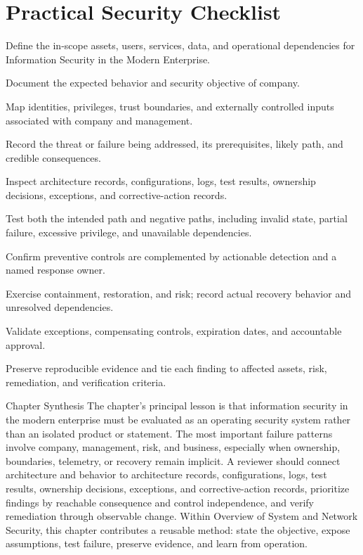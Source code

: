 \documentclass[11pt,letterpaper]{article}
\begin{document}
\section*{Practical Security Checklist}
\begin{CornellChecklist}
\item Define the in-scope assets, users, services, data, and operational dependencies for Information Security in the Modern Enterprise.
\item Document the expected behavior and security objective of company.
\item Map identities, privileges, trust boundaries, and externally controlled inputs associated with company and management.
\item Record the threat or failure being addressed, its prerequisites, likely path, and credible consequences.
\item Inspect architecture records, configurations, logs, test results, ownership decisions, exceptions, and corrective-action records.
\item Test both the intended path and negative paths, including invalid state, partial failure, excessive privilege, and unavailable dependencies.
\item Confirm preventive controls are complemented by actionable detection and a named response owner.
\item Exercise containment, restoration, and risk; record actual recovery behavior and unresolved dependencies.
\item Validate exceptions, compensating controls, expiration dates, and accountable approval.
\item Preserve reproducible evidence and tie each finding to affected assets, risk, remediation, and verification criteria.
\end{CornellChecklist}
\begin{CornellSummaryBox}{Chapter Synthesis}
The chapter's principal lesson is that information security in the modern enterprise must be evaluated as an operating security system rather than an isolated product or statement. The most important failure patterns involve company, management, risk, and business, especially when ownership, boundaries, telemetry, or recovery remain implicit. A reviewer should connect architecture and behavior to architecture records, configurations, logs, test results, ownership decisions, exceptions, and corrective-action records, prioritize findings by reachable consequence and control independence, and verify remediation through observable change. Within Overview of System and Network Security, this chapter contributes a reusable method: state the objective, expose assumptions, test failure, preserve evidence, and learn from operation.
\end{CornellSummaryBox}
\end{document}
